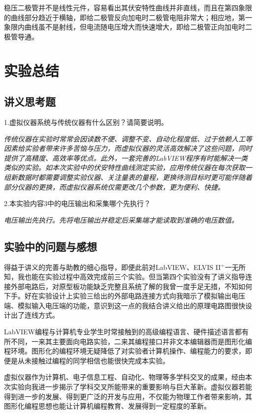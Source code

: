 \documentclass[UTF8]{article}
\theoremstyle{MyLineTheoremStyle} %
\theoremstyle{MyBlockTheoremStyle} %
\theoremstyle{MySubsubsectionStyle} %
\begin{document}

稳压二极管并不是线性元件，容易看出其伏安特性曲线并非直线，而且在第四象限的曲线部分趋近于横轴，即给二极管反向加电时二极管电阻非常大；相应地，第一象限内曲线虽不是射线，但电流随电压增大而快速增大，即给二极管正向加电时二极管导通。

\section{实验总结}
\subsection{讲义思考题}
1.虚拟仪器系统与传统仪器有什么区别？请简要说明。

\textit{传统仪器在实验时常常会因读数不便、调整不变、自动化程度低、过于依赖人工等因素给实验者带来许多苦恼与压力，而虚拟仪器的灵活高效解决了这些问题，同时提供了高精度、高效率等优点。此外，一套完善的LabVIEW程序有时能解决一类类似的实验。如本次实验中的伏安特性曲线测定实验，应用传统仪器在每次获取一组新数据时都需要调整实验仪器、关注量表的量程，更换待测目标时更可能伴随着部分仪器的更换，而虚拟仪器系统仅需更改几个参数，更为便利、快捷。}

2.本实验内容3中的电压输出和采集哪个先执行？

\textit{电压输出先执行。先将电压输出并稳定后采集端才能读取到准确的电压数值。}

\subsection{实验中的问题与感想}
得益于讲义的完善与助教的细心指导，即便此前对LabVIEW、ELVIS II$ ^+ $一无所知，我也能在实验过程中高效完成前三个实验。但当第四个实验没有了讲义指导连接外部电路后，对原型板功能缺乏完整且系统了解的我曾一度手足无措，不知如何下手。好在实验设计上实验三给出的外部电路连接方式向我暗示了模拟输出电压端、模拟输入电压端的功能，意识到这一点的我结合讲义给出的原理电路图很快设计出了连线方式。

LabVIEW编程与计算机专业学生时常接触到的高级编程语言、硬件描述语言都有所不同，一来其主要面向电路实验，二来其编程接口并非文本编辑器而是图形化编程环境。图形化的编程环境无疑降低了对实验者计算机操作、编程能力的要求，即便是从未接触过编程的同学相信也能很快完成本实验。

虚拟仪器作为计算机、电子信息工程、自动化、物理等多学科交叉的成果，经由本次实验向我进一步揭示了学科交叉所能带来的重要影响与巨大革新。虚拟仪器若能得到进一步的发展、得到更广泛的开发与应用，不仅能为物理工作者带来影响，其图形化编程思想也能让计算机编程教育、发展得到一定程度的革新。
\end{document}
